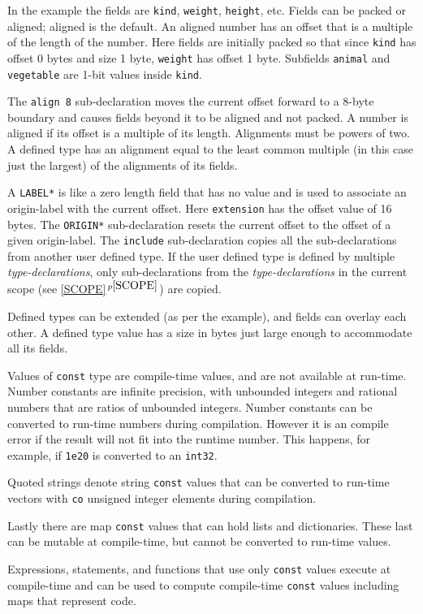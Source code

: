 \documentclass[12pt]{article}
\newcommand{\itemref}[1]{\ref{#1}$\,^{p\pageref{#1}}$}
\begin{document}
In the example the fields are {\tt kind}, {\tt weight}, {\tt height}, etc.
Fields can be packed or aligned; aligned is the default.  An aligned number has an offset
that is a multiple of the length of the number.
Here fields are initially packed
so that since {\tt kind} has offset 0 bytes and size 1 byte,
{\tt weight} has offset 1 byte.  Subfields {\tt animal}
and {\tt vegetable} are 1-bit values inside {\tt kind}.

The {\tt align 8} sub-declaration moves the current offset
forward to a 8-byte boundary and causes fields beyond it
to be aligned and not packed.  A number is aligned if
its offset is a multiple of its length.  Alignments must be powers of two.
A defined type has an
alignment equal to the least common multiple (in this case just the
largest) of the
alignments of its fields.

A {\tt *LABEL*} is like a zero length field that has no value and
is used to associate an origin-label with the current offset.
Here {\tt extension} has the offset value of 16 bytes.
The {\tt *ORIGIN*} sub-declaration resets the current offset to the offset
of a given origin-label.
The {\tt include} sub-declaration copies all the sub-declarations
from another user defined type.  If the user defined type is
defined by multiple {\em type-declarations}, only sub-declarations
from the {\em type-declarations} in the current scope (see \itemref{SCOPE})
are copied.

Defined types can be extended
(as per the example), and fields can overlay each other.
A defined type value has a size in bytes just large enough to
accommodate all its fields.

Values of {\tt const} type are compile-time values, and are
not available at run-time.  Number constants are infinite
precision, with unbounded integers and rational numbers that
are ratios of unbounded integers.  Number constants
can be converted to run-time numbers during compilation.
However it is an compile error
if the result will not fit into the runtime number.
This happens, for example, if {\tt 1e20}
is converted to an {\tt int32}.

Quoted strings denote string {\tt const} values that can be
converted to run-time vectors
with {\tt co} unsigned integer elements during compilation.

Lastly there are map {\tt const} values that can hold lists
and dictionaries.  These last can be mutable at compile-time,
but cannot be converted to run-time values.

Expressions, statements, and functions that use only {\tt const} values
execute at compile-time and can be used to compute compile-time
{\tt const} values including maps that represent code.
\end{document}
